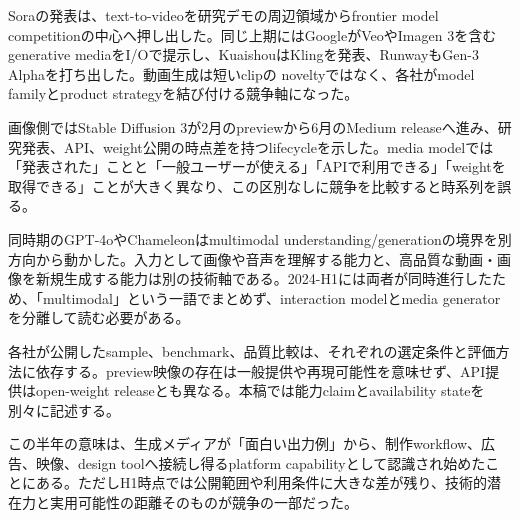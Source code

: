 
Soraの発表は、text-to-videoを研究デモの周辺領域からfrontier model competitionの中心へ押し出した。同じ上期にはGoogleがVeoやImagen 3を含むgenerative mediaをI/Oで提示し、KuaishouはKlingを発表、RunwayもGen-3 Alphaを打ち出した。動画生成は短いclipの noveltyではなく、各社がmodel familyとproduct strategyを結び付ける競争軸になった。\autocite{src-0f33134a9129,src-0fe343211040,src-9c32b95d27a7,src-b881d1321d94}


画像側ではStable Diffusion 3が2月のpreviewから6月のMedium releaseへ進み、研究発表、API、weight公開の時点差を持つlifecycleを示した。media modelでは「発表された」ことと「一般ユーザーが使える」「APIで利用できる」「weightを取得できる」ことが大きく異なり、この区別なしに競争を比較すると時系列を誤る。\autocite{src-7b3484ead314}


同時期のGPT-4oやChameleonはmultimodal understanding/generationの境界を別方向から動かした。入力として画像や音声を理解する能力と、高品質な動画・画像を新規生成する能力は別の技術軸である。2024-H1には両者が同時進行したため、「multimodal」という一語でまとめず、interaction modelとmedia generatorを分離して読む必要がある。\autocite{src-0f33134a9129,src-0fe343211040,src-2d3a533e91db,src-e1259b3c0804}


\begin{claimboundary}
各社が公開したsample、benchmark、品質比較は、それぞれの選定条件と評価方法に依存する。preview映像の存在は一般提供や再現可能性を意味せず、API提供はopen-weight releaseとも異なる。本稿では能力claimとavailability stateを別々に記述する。\autocite{src-0f33134a9129,src-0fe343211040,src-36cdd427b766,src-7b3484ead314,src-9c32b95d27a7}
\end{claimboundary}

この半年の意味は、生成メディアが「面白い出力例」から、制作workflow、広告、映像、design toolへ接続し得るplatform capabilityとして認識され始めたことにある。ただしH1時点では公開範囲や利用条件に大きな差が残り、技術的潜在力と実用可能性の距離そのものが競争の一部だった。\autocite{src-0f33134a9129,src-0fe343211040,src-7b3484ead314,src-9c32b95d27a7,src-b881d1321d94}
